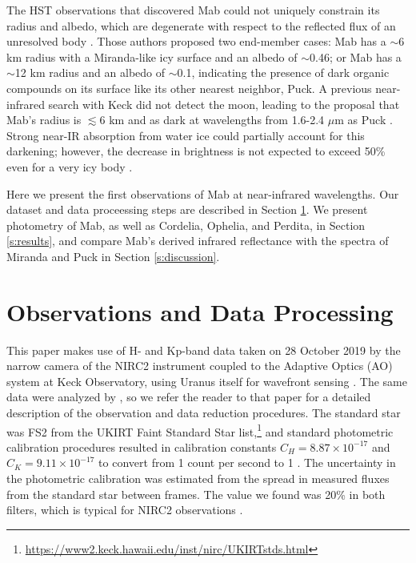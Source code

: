 \documentclass[preprint]{aastex631}
\begin{document}
The HST observations that discovered Mab could not uniquely constrain its radius and albedo, which are degenerate with respect to the reflected flux of an unresolved body \citep{showalter06}. Those authors proposed two end-member cases: Mab has a $\sim$6 km radius with a Miranda-like icy surface and an albedo of $\sim$0.46; or Mab has a $\sim$12 km radius and an albedo of $\sim$0.1, indicating the presence of dark organic compounds on its surface like its other nearest neighbor, Puck. A previous near-infrared search with Keck did not detect the moon, leading to the proposal that Mab's radius is $\lesssim$6 km and as dark at wavelengths from 1.6-2.4 $\mu$m as Puck \citep[albedo $\lesssim$0.11;][]{paradis19, paradis23}. Strong near-IR absorption from water ice could partially account for this darkening; however, the decrease in brightness is not expected to exceed 50\% even for a very icy body \citep[c.f. Haumea, one of the purest amorphous ice surfaces in the solar system;][]{gourgeot16}.

Here we present the first observations of Mab at near-infrared wavelengths. Our dataset and data proceessing steps are described in Section \ref{s:observations}. We present photometry of Mab, as well as Cordelia, Ophelia, and Perdita, in Section \ref{s:results}, and compare Mab's derived infrared reflectance with the spectra of Miranda and Puck in Section \ref{s:discussion}.

\section{Observations and Data Processing}
\label{s:observations}

This paper makes use of H- and Kp-band data taken on 28 October 2019 by the narrow camera of the NIRC2 instrument coupled to the Adaptive Optics (AO) system at Keck Observatory, using Uranus itself for wavefront sensing \citep{wizinowich00, vandam04}. The same data were analyzed by \citet{paradis23}, so we refer the reader to that paper for a detailed description of the observation and data reduction procedures. The standard star was FS2 from the UKIRT Faint Standard Star list,\footnote{\url{https://www2.keck.hawaii.edu/inst/nirc/UKIRTstds.html}} and standard photometric calibration procedures resulted in calibration constants $C_H = 8.87\times10^{-17}$ and $C_K = 9.11\times10^{-17}$ to convert from 1 count per second to 1 \ergsec{}. The uncertainty in the photometric calibration was estimated from the spread in measured fluxes from the standard star between frames. The value we found was 20\% in both filters, which is typical for NIRC2 observations \citep{depater14, molter19}.
\end{document}
